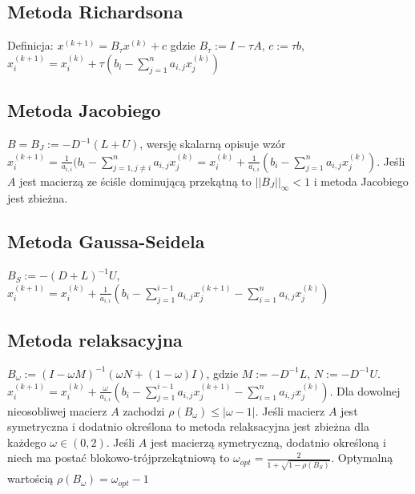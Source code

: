 \documentclass{article}
\begin{document}
\begin{minipage}[t]{.33\textwidth}
\subsection*{Metoda Richardsona}
Definicja: $x^{(k+1)}=B_{\tau}x^{(k)} + c$ gdzie $B_\tau := I - \tau A$, $c:= \tau b$, $x_i^{(k+1)}=x_i^{(k)} + \tau\left(b_i - \sum_{j=1}^na_{i,j}x_j^{(k)}\right)$
\subsection*{Metoda Jacobiego}
$B = B_J := -D^{-1}(L+U)$, wersję skalarną opisuje wzór $x_i^{(k+1)}=\frac{1}{a_{i,i}}(b_i - \sum_{j=1,j\neq i}^na_{i,j}x_j^{(k)} = x_i^{(k)} + \frac{1}{a_{i,i}}\left(b_i - \sum_{j=1}^na_{i,j}x_j^{(k)}\right)$. Jeśli $A$ jest macierzą ze ściśle dominującą przekątną to $||B_J||_\infty < 1$ i metoda Jacobiego jest zbieżna.
\subsection*{Metoda Gaussa-Seidela}
$B_S := -(D+L)^{-1}U$, $x_i^{(k+1)}=x_i^{(k)}+\frac{1}{a_{i,i}}\left(b_i - \sum_{j=1}^{i-1}a_{i,j}x_j^{(k+1)} - \sum_{i=1}^na_{i,j}x_j^{(k)}\right)$
\subsection*{Metoda relaksacyjna}
$B_\omega := (I-\omega M)^{-1}(\omega N + (1-\omega)I)$, gdzie $M := -D^{-1}L$, $N:=-D^{-1}U$. $x_i^{(k+1)}=x_i^{(k)}+\frac{\omega}{a_{i,i}}\left(b_i - \sum_{j=1}^{i-1}a_{i,j}x_j^{(k+1)} - \sum_{i=1}^na_{i,j}x_j^{(k)}\right)$. Dla dowolnej nieosobliwej macierz $A$ zachodzi $\rho(B_\omega) \leq |\omega -1|$. Jeśli  macierz $A$ jest symetryczna i dodatnio określona to metoda relaksacyjna jest zbieżna dla każdego $\omega \in (0,2)$. Jeśli $A$ jest macierzą symetryczną, dodatnio określoną i niech ma postać blokowo-trójprzekątniową to $\omega_{opt} = \frac{2}{1+\sqrt{1-\rho(B_S)}}$. Optymalną wartością $\rho(B_\omega) = \omega_{opt}-1$
\end{minipage}
\end{document}

